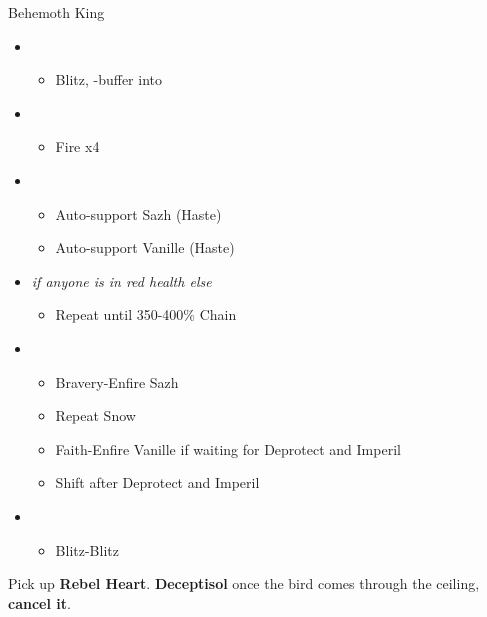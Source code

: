 \begin{battle}[0:53]{Behemoth King}
	\begin{itemize}
		\item \second
		      \begin{itemize}
			      \item Blitz, \rav-buffer into
		      \end{itemize}
		\item \sixth
		      \begin{itemize}
			      \item Fire x4
		      \end{itemize}
		\item \fourth
		      \begin{itemize}
			      \item Auto-support Sazh (Haste)
			      \item Auto-support Vanille (Haste)
		      \end{itemize}
		\item \fifth \textit{if anyone is in red health else} \sixth
		      \begin{itemize}
			      \item Repeat until 350-400\% Chain
		      \end{itemize}
		\item \third
		      \begin{itemize}
			      \item Bravery-Enfire Sazh
			      \item Repeat Snow
			      \item Faith-Enfire Vanille if waiting for Deprotect and Imperil
			      \item Shift after Deprotect and Imperil
		      \end{itemize}
		\item \second
		      \begin{itemize}
			      \item Blitz-Blitz
		      \end{itemize}
	\end{itemize}
\end{battle}

Pick up \textbf{Rebel Heart}.
\textbf{Deceptisol} once the bird comes through the ceiling, \textbf{cancel it}.


